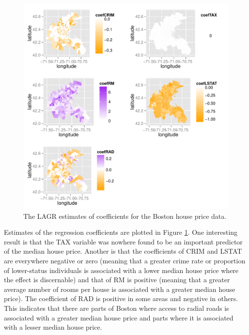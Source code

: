 \documentclass[authoryear,review, 12pt]{elsarticle}
\newcommand{\maxwidth}{\textwidth}
\begin{document}
\begin{figure}

\includegraphics[width=\maxwidth]{figure/boston-plots} 


\caption{The LAGR estimates of coefficients for the Boston house price data.\label{fig:boston-lagr-coefs}}
\end{figure}

Estimates of the regression coefficients are plotted in Figure \ref{fig:boston-lagr-coefs}.
One interesting result is that the TAX variable was nowhere found
to be an important predictor of the median house price. Another is
that the coefficients of CRIM and LSTAT are everywhere negative or
zero (meaning that a greater crime rate or proportion of lower-status
individuals is associated with a lower median house price where the
effect is discernable) and that of RM is positive (meaning that a
greater average number of rooms per house is associated with a greater
median house price). The coefficient of RAD is positive in some areas
and negative in others. This indicates that there are parts of Boston
where access to radial roads is associated with a greater median house
price and parts where it is associated with a lesser median house
price.
\end{document}
